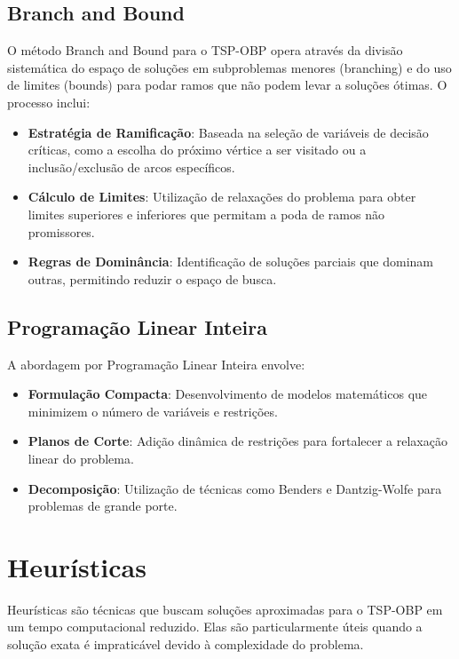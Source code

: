 \documentclass[12pt, a4paper]{report}
\begin{document}
\subsection{Branch and Bound}
O método Branch and Bound para o TSP-OBP opera através da divisão sistemática do espaço de soluções em subproblemas menores (branching) e do uso de limites (bounds) para podar ramos que não podem levar a soluções ótimas. O processo inclui:

\begin{itemize}
    \item \textbf{Estratégia de Ramificação}: Baseada na seleção de variáveis de decisão críticas, como a escolha do próximo vértice a ser visitado ou a inclusão/exclusão de arcos específicos.
    
    \item \textbf{Cálculo de Limites}: Utilização de relaxações do problema para obter limites superiores e inferiores que permitam a poda de ramos não promissores.
    
    \item \textbf{Regras de Dominância}: Identificação de soluções parciais que dominam outras, permitindo reduzir o espaço de busca.
\end{itemize}

\subsection{Programação Linear Inteira}
A abordagem por Programação Linear Inteira envolve:

\begin{itemize}
    \item \textbf{Formulação Compacta}: Desenvolvimento de modelos matemáticos que minimizem o número de variáveis e restrições.
    
    \item \textbf{Planos de Corte}: Adição dinâmica de restrições para fortalecer a relaxação linear do problema.
    
    \item \textbf{Decomposição}: Utilização de técnicas como Benders e Dantzig-Wolfe para problemas de grande porte.
\end{itemize}

\section{Heurísticas}
Heurísticas são técnicas que buscam soluções aproximadas para o TSP-OBP em um tempo computacional reduzido. Elas são particularmente úteis quando a solução exata é impraticável devido à complexidade do problema.
\end{document}
